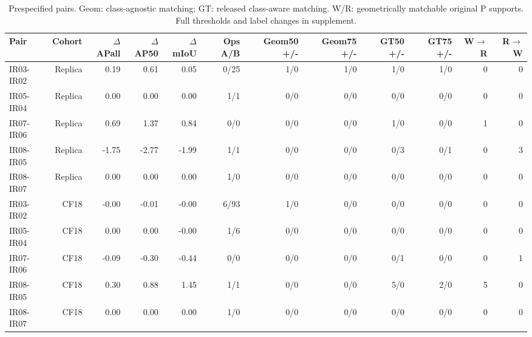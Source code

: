 \begin{table}[t]
\centering
\small
\begin{tabular}{lrrrrrrrrrrr}
\toprule
Pair & Cohort & $\Delta$APall & $\Delta$AP50 & $\Delta$mIoU & Ops A/B & Geom50 +/- & Geom75 +/- & GT50 +/- & GT75 +/- & W$\to$R & R$\to$W \\
\midrule
IR03-IR02 & Replica & 0.19 & 0.61 & 0.05 & 0/25 & 1/0 & 1/0 & 1/0 & 1/0 & 0 & 0 \\
IR05-IR04 & Replica & 0.00 & 0.00 & 0.00 & 1/1 & 0/0 & 0/0 & 0/0 & 0/0 & 0 & 0 \\
IR07-IR06 & Replica & 0.69 & 1.37 & 0.84 & 0/0 & 0/0 & 0/0 & 1/0 & 0/0 & 1 & 0 \\
IR08-IR05 & Replica & -1.75 & -2.77 & -1.99 & 1/1 & 0/0 & 0/0 & 0/3 & 0/1 & 0 & 3 \\
IR08-IR07 & Replica & 0.00 & 0.00 & 0.00 & 1/0 & 0/0 & 0/0 & 0/0 & 0/0 & 0 & 0 \\
IR03-IR02 & CF18 & -0.00 & -0.01 & -0.00 & 6/93 & 1/0 & 0/0 & 0/0 & 0/0 & 0 & 0 \\
IR05-IR04 & CF18 & 0.00 & 0.00 & -0.00 & 1/6 & 0/0 & 0/0 & 0/0 & 0/0 & 0 & 0 \\
IR07-IR06 & CF18 & -0.09 & -0.30 & -0.44 & 0/0 & 0/0 & 0/0 & 0/1 & 0/0 & 0 & 1 \\
IR08-IR05 & CF18 & 0.30 & 0.88 & 1.45 & 1/1 & 0/0 & 0/0 & 5/0 & 2/0 & 5 & 0 \\
IR08-IR07 & CF18 & 0.00 & 0.00 & 0.00 & 1/0 & 0/0 & 0/0 & 0/0 & 0/0 & 0 & 0 \\
\bottomrule
\end{tabular}
\caption{Prespecified pairs. Geom: class-agnostic matching; GT: released class-aware matching. W/R: geometrically matchable original P supports. Full thresholds and label changes in supplement.}
\label{tab:minimal-repair-2}
\end{table}
